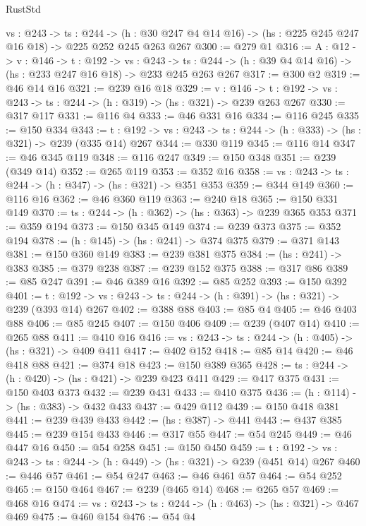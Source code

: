 \begin{lexlean}{RustStd}
\begin{coremodule}
  {vs : @243} ->
  {ts : @244} ->
  (h : @30 @247 @4 @14 @16) -> (hs : @225 @245 @247 @16 @18) -> @225 @252 @245 @263 @267
@300 := @279 @1
@316 := {A : @12} ->
  {v : @146} ->
  {t : @192} ->
  {vs : @243} ->
  {ts : @244} -> (h : @39 @4 @14 @16) -> (hs : @233 @247 @16 @18) -> @233 @245 @263 @267
@317 := @300 @2
@319 := @46 @14 @16
@321 := @239 @16 @18
@329 := {v : @146} ->
  {t : @192} -> {vs : @243} -> {ts : @244} -> (h : @319) -> (hs : @321) -> @239 @263 @267
@330 := @317 @117
@331 := @116 @4
@333 := @46 @331 @16
@334 := @116 @245
@335 := @150 @334
@343 := {t : @192} ->
  {vs : @243} -> {ts : @244} -> (h : @333) -> (hs : @321) -> @239 (@335 @14) @267
@344 := @330 @119
@345 := @116 @14
@347 := @46 @345 @119
@348 := @116 @247
@349 := @150 @348
@351 := @239 (@349 @14)
@352 := @265 @119
@353 := @352 @16
@358 := {vs : @243} -> {ts : @244} -> (h : @347) -> (hs : @321) -> @351 @353
@359 := @344 @149
@360 := @116 @16
@362 := @46 @360 @119
@363 := @240 @18
@365 := @150 @331 @149
@370 := {ts : @244} -> (h : @362) -> (hs : @363) -> @239 @365 @353
@371 := @359 @194
@373 := @150 @345 @149
@374 := @239 @373
@375 := @352 @194
@378 := (h : @145) -> (hs : @241) -> @374 @375
@379 := @371 @143
@381 := @150 @360 @149
@383 := @239 @381 @375
@384 := (hs : @241) -> @383
@385 := @379 @238
@387 := @239 @152 @375
@388 := @317 @86
@389 := @85 @247
@391 := @46 @389 @16
@392 := @85 @252
@393 := @150 @392
@401 := {t : @192} ->
  {vs : @243} -> {ts : @244} -> (h : @391) -> (hs : @321) -> @239 (@393 @14) @267
@402 := @388 @88
@403 := @85 @4
@405 := @46 @403 @88
@406 := @85 @245
@407 := @150 @406
@409 := @239 (@407 @14)
@410 := @265 @88
@411 := @410 @16
@416 := {vs : @243} -> {ts : @244} -> (h : @405) -> (hs : @321) -> @409 @411
@417 := @402 @152
@418 := @85 @14
@420 := @46 @418 @88
@421 := @374 @18
@423 := @150 @389 @365
@428 := {ts : @244} -> (h : @420) -> (hs : @421) -> @239 @423 @411
@429 := @417 @375
@431 := @150 @403 @373
@432 := @239 @431
@433 := @410 @375
@436 := (h : @114) -> (hs : @383) -> @432 @433
@437 := @429 @112
@439 := @150 @418 @381
@441 := @239 @439 @433
@442 := (hs : @387) -> @441
@443 := @437 @385
@445 := @239 @154 @433
@446 := @317 @55
@447 := @54 @245
@449 := @46 @447 @16
@450 := @54 @258
@451 := @150 @450
@459 := {t : @192} ->
  {vs : @243} -> {ts : @244} -> (h : @449) -> (hs : @321) -> @239 (@451 @14) @267
@460 := @446 @57
@461 := @54 @247
@463 := @46 @461 @57
@464 := @54 @252
@465 := @150 @464
@467 := @239 (@465 @14)
@468 := @265 @57
@469 := @468 @16
@474 := {vs : @243} -> {ts : @244} -> (h : @463) -> (hs : @321) -> @467 @469
@475 := @460 @154
@476 := @54 @4

\end{coremodule}
\end{lexlean}
